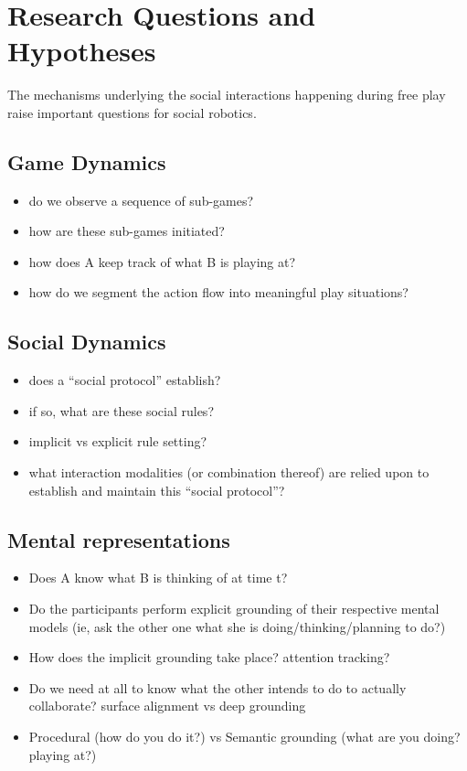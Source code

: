 \documentclass[a4paper]{article}
\begin{document}
\section{Research Questions and Hypotheses}

The mechanisms underlying the social interactions happening during free play
raise important questions for social robotics.


\subsection{Game Dynamics}

\begin{itemize}
    \item do we observe a sequence of sub-games?
    \item how are these sub-games initiated?
    \item how does A keep track of what B is playing at?
    \item how do we segment the action flow into meaningful play situations?
\end{itemize}

\subsection{Social Dynamics}

\begin{itemize}
    \item does a ``social protocol'' establish?
    \item if so, what are these social rules?
    \item implicit vs explicit rule setting?
    \item what interaction modalities (or combination thereof) are relied upon
        to establish and maintain this ``social protocol''?
\end{itemize}

\subsection{Mental representations}

\begin{itemize}
    \item Does A know what B is thinking of at time t?
    \item Do the participants perform explicit grounding of their respective mental models
        (ie, ask the other one what she is doing/thinking/planning to do?)
    \item How does the implicit grounding take place? attention tracking?
    \item Do we need at all to know what the other intends to do to actually
        collaborate? surface alignment vs deep grounding
    \item Procedural (how do you do it?) vs Semantic
        grounding (what are you doing? playing at?)
\end{itemize}
\end{document}
